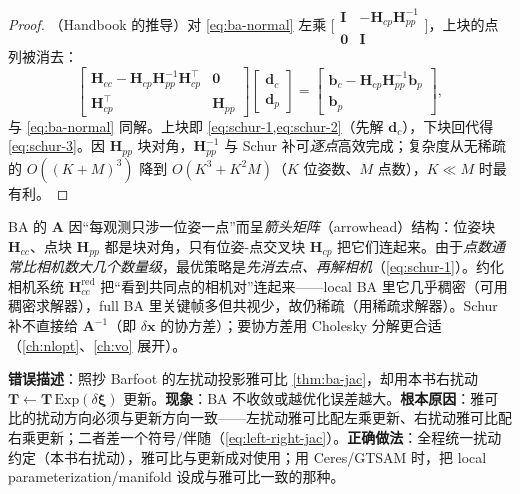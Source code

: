 \begin{proof}
（Handbook 的推导\cite{carlone2026handbook}）对 \cref{eq:ba-normal} 左乘 $\big[\begin{smallmatrix}\mathbf{I}&-\mathbf{H}_{cp}\mathbf{H}_{pp}^{-1}\\\mathbf{0}&\mathbf{I}\end{smallmatrix}\big]$，上块的点列被消去：
\[
  \begin{bmatrix}\mathbf{H}_{cc}-\mathbf{H}_{cp}\mathbf{H}_{pp}^{-1}\mathbf{H}_{cp}^\top&\mathbf{0}\\\mathbf{H}_{cp}^\top&\mathbf{H}_{pp}\end{bmatrix}
  \begin{bmatrix}\mathbf{d}_c\\\mathbf{d}_p\end{bmatrix}
  =\begin{bmatrix}\mathbf{b}_c-\mathbf{H}_{cp}\mathbf{H}_{pp}^{-1}\mathbf{b}_p\\\mathbf{b}_p\end{bmatrix},
\]
与 \cref{eq:ba-normal} 同解。上块即 \cref{eq:schur-1,eq:schur-2}（先解 $\mathbf{d}_c$），下块回代得 \cref{eq:schur-3}。因 $\mathbf{H}_{pp}$ 块对角，$\mathbf{H}_{pp}^{-1}$ 与 Schur 补可\emph{逐点}高效完成；复杂度从无稀疏的 $O((K+M)^3)$ 降到 $O(K^3+K^2M)$（$K$ 位姿数、$M$ 点数），$K\ll M$ 时最有利\cite{barfoot2024state}。
\end{proof}

\begin{insight}
BA 的 $\mathbf{A}$ 因“每观测只涉一位姿一点”而呈\emph{箭头矩阵}（arrowhead）结构\cite{barfoot2024state}：位姿块 $\mathbf{H}_{cc}$、点块 $\mathbf{H}_{pp}$ 都是块对角，只有位姿-点交叉块 $\mathbf{H}_{cp}$ 把它们连起来。由于\emph{点数通常比相机数大几个数量级}，最优策略是\emph{先消去点、再解相机}（\cref{eq:schur-1}）。约化相机系统 $\mathbf{H}_{cc}^{\text{red}}$ 把“看到共同点的相机对”连起来——local BA 里它几乎稠密（可用稠密求解器），full BA 里关键帧多但共视少，故仍稀疏（用稀疏求解器）。Schur 补不直接给 $\mathbf{A}^{-1}$（即 $\delta\mathbf{x}$ 的协方差）；要协方差用 Cholesky 分解更合适\cite{barfoot2024state}（\cref{ch:nlopt}、\cref{ch:vo} 展开）。
\end{insight}

\begin{pitfall}
\textbf{错误描述}：照抄 Barfoot 的左扰动投影雅可比 \cref{thm:ba-jac}，却用本书右扰动 $\mathbf{T}\leftarrow\mathbf{T}\,\mathrm{Exp}(\delta\boldsymbol\xi)$ 更新。\textbf{现象}：BA 不收敛或越优化误差越大。\textbf{根本原因}：雅可比的扰动方向必须与更新方向一致——左扰动雅可比配左乘更新、右扰动雅可比配右乘更新；二者差一个符号/伴随（\cref{eq:left-right-jac}）。\textbf{正确做法}：全程统一扰动约定（本书右扰动），雅可比与更新成对使用；用 Ceres/GTSAM 时，把 local parameterization/manifold 设成与雅可比一致的那种。
\end{pitfall}


